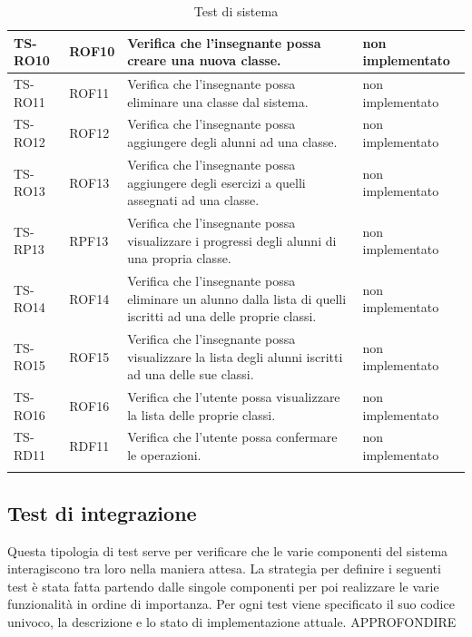 \begin{longtable}{|>{\centering\arraybackslash}m{1.6cm}|>{\centering\arraybackslash}m{1.7cm}|m{6.41cm}|>{\centering\arraybackslash}m{3.1cm}|}
		\rowcolor{white}
		TS-RO10	
		& ROF10 
		& Verifica che l'insegnante possa creare una nuova classe. 
		& non implementato\\ \hline
		\rowcolor{LightGray}
		TS-RO11	
		& ROF11 
		& Verifica che l'insegnante possa eliminare una classe dal sistema. 
		& non implementato\\ \hline
		\rowcolor{white}
		TS-RO12
		& ROF12 
		& Verifica che l'insegnante possa aggiungere degli alunni ad una classe. 
		& non implementato\\ \hline
		\rowcolor{LightGray}
		TS-RO13
		& ROF13 
		& Verifica che l'insegnante possa aggiungere degli esercizi a quelli assegnati ad una classe. 
		& non implementato\\ \hline
		\rowcolor{white}
		TS-RP13
		& RPF13 
		& Verifica che l'insegnante possa visualizzare i progressi degli alunni di una propria classe.
		& non implementato\\ \hline
		\rowcolor{LightGray}
		TS-RO14
		& ROF14 
		& Verifica che l'insegnante possa eliminare un alunno dalla lista di quelli iscritti ad una delle proprie classi. 
		& non implementato\\ \hline
		\rowcolor{white}
		TS-RO15	
		& ROF15 
		& Verifica che l'insegnante possa visualizzare la lista degli alunni iscritti ad una delle sue classi. 
		& non implementato\\ \hline
		\rowcolor{LightGray}
		TS-RO16
		& ROF16 
		& Verifica che l'utente possa visualizzare la lista delle proprie classi. 
		& non implementato\\ \hline
		\rowcolor{white}
		TS-RD11	
		& RDF11 
		& Verifica che l'utente possa confermare le operazioni.
		& non implementato\\ \hline
		
		\caption{Test di sistema}
\end{longtable}

\subsection{Test di integrazione}
Questa tipologia di test serve per verificare che le varie componenti del sistema interagiscono tra loro nella maniera attesa. La strategia per definire i seguenti test è stata fatta partendo dalle singole componenti per poi realizzare le varie funzionalità in ordine di importanza. Per ogni test viene specificato il suo codice univoco, la descrizione e lo stato di implementazione attuale. APPROFONDIRE

